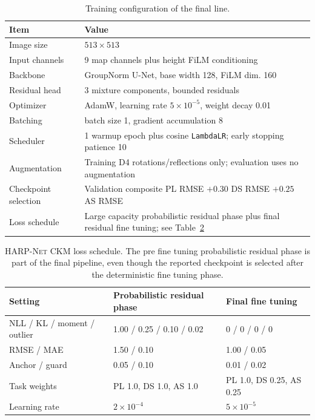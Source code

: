 \documentclass[journal]{IEEEtran}
\begin{document}
\begin{table}[t]
\centering
\caption{Training configuration of the final line.}
\label{tab:training}
\scriptsize
\begin{tabularx}{\linewidth}{lX}
\toprule
Item & Value \\
\midrule
Image size & \(513\times513\) \\
Input channels & 9 map channels plus height FiLM conditioning \\
Backbone & GroupNorm U-Net, base width 128, FiLM dim. 160 \\
Residual head & 3 mixture components, bounded residuals \\
Optimizer & AdamW, learning rate \(5\times10^{-5}\), weight decay 0.01 \\
Batching & batch size 1, gradient accumulation 8 \\
Scheduler & 1 warmup epoch plus cosine \texttt{LambdaLR}; early stopping patience 10 \\
Augmentation & Training D4 rotations/reflections only; evaluation uses no augmentation \\
Checkpoint selection & Validation composite PL RMSE \(+0.30\) DS RMSE \(+0.25\) AS RMSE \\
Loss schedule & Large capacity probabilistic residual phase plus final residual
fine tuning; see Table~\ref{tab:loss-schedule} \\
\bottomrule
\end{tabularx}
\end{table}

\begin{table}[t]
\centering
\caption{\textsc{HARP-Net CKM} loss schedule. The pre fine tuning probabilistic residual phase is part
of the final pipeline, even though the reported checkpoint is selected after
the deterministic fine tuning phase.}
\label{tab:loss-schedule}
\scriptsize
\begin{tabularx}{\linewidth}{lXX}
\toprule
Setting & Probabilistic residual phase & Final fine tuning \\
\midrule
NLL / KL / moment / outlier & 1.00 / 0.25 / 0.10 / 0.02 & 0 / 0 / 0 / 0 \\
RMSE / MAE & 1.50 / 0.10 & 1.00 / 0.05 \\
Anchor / guard & 0.05 / 0.10 & 0.01 / 0.02 \\
Task weights & PL 1.0, DS 1.0, AS 1.0 & PL 1.0, DS 0.25, AS 0.25 \\
Learning rate & \(2\times10^{-4}\) & \(5\times10^{-5}\) \\
\bottomrule
\end{tabularx}
\end{table}
\end{document}
